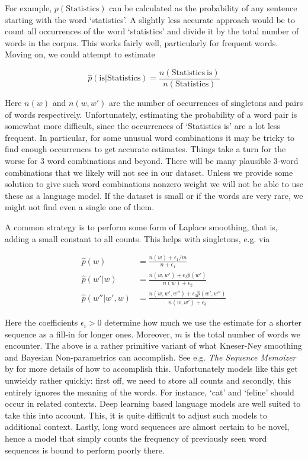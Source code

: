 For example, $p(\mathrm{Statistics})$ can be calculated as the probability of any sentence starting with the word ‘statistics’. A slightly less accurate approach would be to count all occurrences of the word ‘statistics’ and divide it by the total number of words in the corpus. This works fairly well, particularly for frequent words. Moving on, we could attempt to estimate

$$\hat{p}(\mathrm{is}|\mathrm{Statistics}) = \frac{n(\mathrm{Statistics~is})}{n(\mathrm{Statistics})}$$

Here $n(w)$ and $n(w, w')$ are the number of occurrences of singletons and pairs of words respectively. Unfortunately, estimating the probability of a word pair is somewhat more difficult, since the occurrences of ‘Statistics is’ are a lot less frequent. In particular, for some unusual word combinations it may be tricky to find enough occurrences to get accurate estimates. Things take a turn for the worse for 3 word combinations and beyond. There will be many plausible 3-word combinations that we likely will not see in our dataset. Unless we provide some solution to give such word combinations nonzero weight we will not be able to use these as a language model. If the dataset is small or if the words are very rare, we might not find even a single one of them.

A common strategy is to perform some form of Laplace smoothing, that is, adding a small constant to all counts. This helps with singletons, e.g. via

$$
\begin{aligned}
    \hat{p}(w) & = \frac{n(w) + \epsilon_1/m}{n + \epsilon_1} \\
    \hat{p}(w'|w) & = \frac{n(w,w') + \epsilon_2 \hat{p}(w')}{n(w) + \epsilon_2} \\
    \hat{p}(w''|w',w) & = \frac{n(w,w',w'') + \epsilon_3 \hat{p}(w',w'')}{n(w,w') + \epsilon_3}
\end{aligned}
$$

Here the coefficients $\epsilon_i > 0$ determine how much we use the estimate for a shorter sequence as a fill-in for longer ones. Moreover, $m$ is the total number of words we encounter. The above is a rather primitive variant of what Kneser-Ney smoothing and Bayesian Non-parametrics can accomplish. See e.g. \textit{The Sequence Memoizer} by \citep{Wood2011} for more details of how to accomplish this. Unfortunately models like this get unwieldy rather quickly: first off, we need to store all counts and secondly, this entirely ignores the meaning of the words. For instance, ‘cat’ and ‘feline’ should occur in related contexts. Deep learning based language models are well suited to take this into account. This, it is quite difficult to adjust such models to additional context. Lastly, long word sequences are almost certain to be novel, hence a model that simply counts the frequency of previously seen word sequences is bound to perform poorly there.

